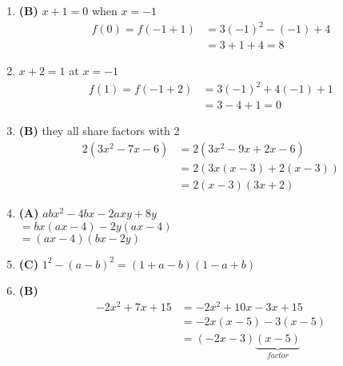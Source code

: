 \begin{multicols}{2}
\begin{enumerate}[label={\textbf{\arabic*.}}]
    \item \textbf{(B)} $x+1 = 0$ when $x = -1$ 
    \begin{align*} 
        f(0) = f(-1 + 1) &= 3(-1)^2 - (-1) + 4 \\
        & = 3 + 1 + 4 = 8
    \end{align*}
    \item $x+2 = 1$ at $x = -1$ 
    \begin{align*} 
        f(1) = f(-1 + 2) &= 3(-1)^2 + 4(-1) + 1 \\
        & = 3 - 4 + 1 = 0
    \end{align*}
    \item \textbf{(B)} they all share factors with 2 
     \begin{align*} 
        2(3x^2 - 7x - 6) & = 2(3x^2 - 9x + 2x -6) \\
        & = 2\left(3x(x - 3) + 2(x - 3)\right) \\
        & = 2(x-3)(3x +2)
    \end{align*}
    \item \textbf{(A)} $abx^2 -4bx -2axy + 8y$  \\
    $= bx(ax - 4) - 2y(ax - 4)$ \\
    $=(ax -4)(bx-2y)$

    \item \textbf{(C)} $1^2 - (a -b)^2 = (1 +a -b)(1 -a + b)$

    \item\textbf{(B)} \begin{align*}
        -2x^2 + 7x + 15 &= -2x^2 + 10x - 3x + 15 \\
        & = -2x(x -5) -3(x-5) \\
        & = (-2x -3)\underbrace{(x-5)}_{factor}
    \end{align*}
    

\end{enumerate}
\end{multicols}
